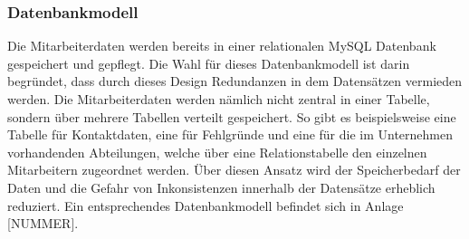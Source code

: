     \subsubsection{Datenbankmodell}
        Die Mitarbeiterdaten werden bereits in einer relationalen MySQL Datenbank gespeichert und gepflegt. Die Wahl für dieses Datenbankmodell ist darin begründet, dass durch dieses Design Redundanzen in dem Datensätzen vermieden werden. Die Mitarbeiterdaten werden nämlich nicht zentral in einer Tabelle, sondern über mehrere Tabellen verteilt gespeichert. So gibt es beispielsweise eine Tabelle für Kontaktdaten, eine für Fehlgründe und eine für die im Unternehmen vorhandenden Abteilungen, welche über eine Relationstabelle den einzelnen Mitarbeitern zugeordnet werden. Über diesen Ansatz wird der Speicherbedarf der Daten und die Gefahr von Inkonsistenzen innerhalb der Datensätze erheblich reduziert. Ein entsprechendes Datenbankmodell befindet sich in Anlage [NUMMER].

